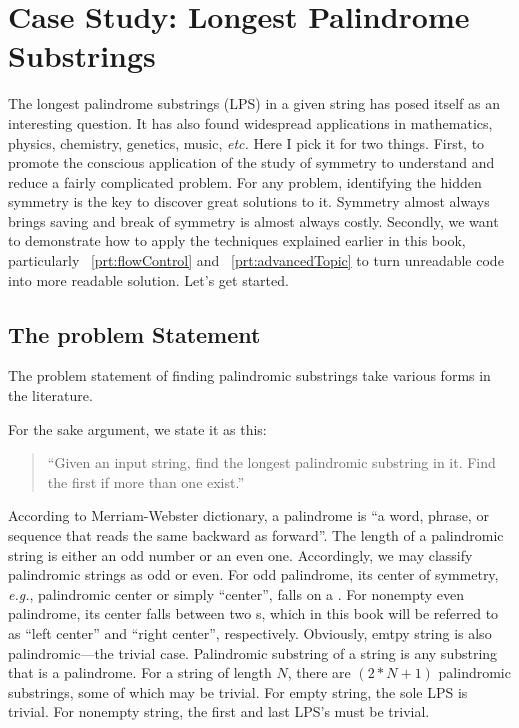 
\chapter{Case Study: Longest Palindrome Substrings}\label{ch:longestPalindromeSubstrings}

The longest palindrome substrings (LPS) in a given string has posed itself as an interesting
question.
It has also found widespread applications in mathematics, physics, chemistry, genetics, music,
\textit{etc.}
Here I pick it for two things.
First, to promote the conscious application of the study of symmetry to
understand and reduce a fairly complicated problem.
For any problem, identifying the hidden symmetry is the key to discover great
solutions to it.
Symmetry almost always brings saving and break of symmetry is almost always costly.
Secondly, we want to demonstrate how to apply the techniques explained earlier in this book,
particularly ~\autoref{prt:flowControl} and ~\autoref{prt:advancedTopic} to turn unreadable code
into more readable solution.
Let's get started.


\section{The problem Statement}\label{sec:lps-statement}

The problem statement of finding palindromic substrings take various forms in the literature.

For the sake argument, we state it as this:
\begin{quote}
    ``Given an input string, find the longest palindromic substring in it.
    Find the first if more than one exist.''
\end{quote}
According to Merriam-Webster dictionary, a palindrome is ``a word, phrase, or sequence that reads
the same backward as forward''.
The length of a palindromic string is either an odd number or an even one.
Accordingly, we may classify palindromic strings as odd or even.
For odd palindrome, its center of symmetry, \textit{e.g.}, palindromic center
or simply ``center'', falls on a .
For nonempty even palindrome, its center falls between two s, which in this book
will be referred to as ``left center'' and ``right center'', respectively.
Obviously, emtpy string is also palindromic---the trivial case.
Palindromic substring of a string is any substring that is a palindrome.
For a string of length $N$, there are $(2 * N + 1)$ palindromic substrings, some of which may be
trivial.
For empty string, the sole LPS is trivial.
For nonempty string, the first and last LPS's must be trivial.


